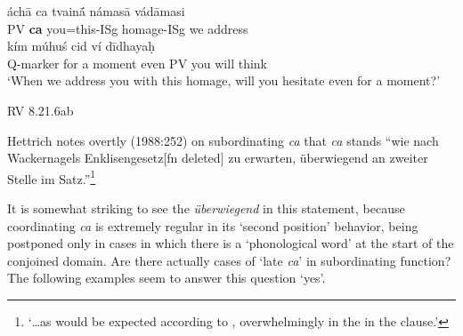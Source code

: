\documentclass[output=paper,
modfonts
]{LSP/langsci}
\begin{document}
\begin{exe}
\ex\gll áchā ca tvainā́ námasā vádāmasi \\
		PV \textbf{ca} you=this-ISg homage-ISg {we address} \\
		
	\gll kím múhuś cid ví dīdhayaḥ \\
		Q-marker {for a moment} even PV {you will think} \\
	\glt `When we address you with this homage, will you hesitate even for a moment?'
	
	\vspace*{-\baselineskip}\hfill {RV 8.21.6ab}
\end{exe}

\noindent Hettrich notes overtly (1988:252) on subordinating \textit{ca} that \textit{ca} stands ``wie nach Wackernagels 
Enklisengesetz[fn deleted] zu erwarten, überwiegend an zweiter Stelle im Satz.''\footnote{`\ldots as would be expected
according to , overwhelmingly in the  in the clause.'}

It is somewhat striking to see the \textit{überwiegend} in this statement, because coordinating
\textit{ca} is extremely regular in its `second position' behavior, being postponed only in cases
in which there is a `phonological word' at the start of the conjoined domain. Are there actually cases
of `late \textit{ca}' in subordinating function? The following examples seem to answer this question
`yes'.

\end{document}
